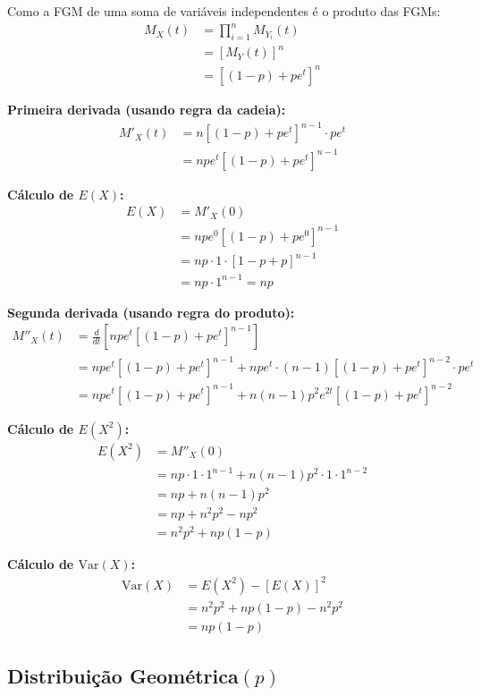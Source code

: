 \documentclass[12pt,a4paper]{article}
\theoremstyle{plain}
\theoremstyle{definition}
\theoremstyle{remark}
\begin{document}
Como a FGM de uma soma de variáveis independentes é o produto das FGMs:
\begin{align}
M_X(t) &= \prod_{i=1}^{n} M_{Y_i}(t) \\
&= [M_Y(t)]^n \\
&= [(1-p) + pe^t]^n
\end{align}

\textbf{Primeira derivada (usando regra da cadeia):}
\begin{align}
M'_X(t) &= n[(1-p) + pe^t]^{n-1} \cdot pe^t \\
&= npe^t[(1-p) + pe^t]^{n-1}
\end{align}

\textbf{Cálculo de \(E(X)\):}
\begin{align}
E(X) &= M'_X(0) \\
&= npe^0[(1-p) + pe^0]^{n-1} \\
&= np \cdot 1 \cdot [1-p + p]^{n-1} \\
&= np \cdot 1^{n-1} = np
\end{align}

\textbf{Segunda derivada (usando regra do produto):}
\begin{align}
M''_X(t) &= \frac{d}{dt}\left[npe^t[(1-p) + pe^t]^{n-1}\right] \\
&= npe^t[(1-p) + pe^t]^{n-1} + npe^t \cdot (n-1)[(1-p) + pe^t]^{n-2} \cdot pe^t \\
&= npe^t[(1-p) + pe^t]^{n-1} + n(n-1)p^2e^{2t}[(1-p) + pe^t]^{n-2}
\end{align}

\textbf{Cálculo de \(E(X^2)\):}
\begin{align}
E(X^2) &= M''_X(0) \\
&= np \cdot 1 \cdot 1^{n-1} + n(n-1)p^2 \cdot 1 \cdot 1^{n-2} \\
&= np + n(n-1)p^2 \\
&= np + n^2p^2 - np^2 \\
&= n^2p^2 + np(1-p)
\end{align}

\textbf{Cálculo de \(\text{Var}(X)\):}
\begin{align}
\text{Var}(X) &= E(X^2) - [E(X)]^2 \\
&= n^2p^2 + np(1-p) - n^2p^2 \\
&= np(1-p)
\end{align}

\subsection{Distribuição Geométrica\((p)\)}
\end{document}
